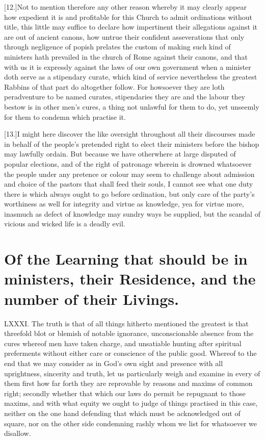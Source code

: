[12.]Not to mention therefore any other reason whereby it may clearly appear how expedient it is and profitable for this Church to admit ordinations without title, this little may suffice to declare how impertinent their allegations against it are out of ancient canons, how untrue their confident asseverations that only through negligence of popish prelates the custom of making such kind of ministers hath prevailed in the church of Rome against their canons, and that with us it is expressly against the laws of our own government when a minister doth serve as a stipendary curate, which kind of service nevertheless the greatest Rabbins of that part do altogether follow. For howsoever they are loth peradventure to be named curates, stipendaries they are and the labour they bestow is in other men’s cures, a thing not unlawful for them to do, yet unseemly for them to condemn which practise it.

[13.]I might here discover the like oversight throughout all their discourses made in behalf of the people’s pretended right to elect their ministers before the bishop may lawfully ordain. But because we have otherwhere at large disputed of popular elections, and of the right of patronage wherein is drowned whatsoever the people under any pretence or colour  may seem to challenge about admission and choice of the pastors that shall feed their souls,
 I cannot see what one duty there is which always ought to go before ordination, but only care of the party’s worthiness as well for integrity and virtue as knowledge, yea for virtue more, inasmuch as defect of knowledge may sundry ways be supplied, but the scandal of vicious and wicked life is a deadly evil.


\section*{Of the Learning that should be in ministers, their Residence, and the number of their Livings.}
LXXXI. The truth is that of all things hitherto mentioned the greatest is that threefold blot or blemish of notable ignorance, unconscionable absence from the cures whereof men have taken charge, and unsatiable hunting after spiritual preferments without either care or conscience of the public good. Whereof to the end that we may consider as in God’s own sight and presence with all uprightness, sincerity and truth, let us particularly weigh and examine in every of them first how far forth they are reprovable by reasons and maxims of common right; secondly whether that which our laws do permit be repugnant to those maxims, and with what equity we ought to judge of things practised in this case, neither on the one hand defending that which must be acknowledged out of square, nor on the other side condemning rashly whom we list for whatsoever we disallow.

